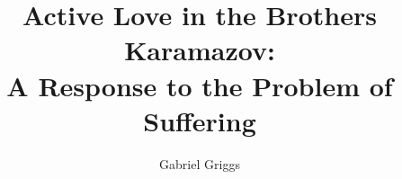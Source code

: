 \documentclass[12pt]{report}
\begin{document}
    
       \graduationmonth{}
       \graduationyear{}
       \author{Gabriel Griggs}
       \committee{}{}{}{}{}
       \title{Active Love in the Brothers Karamazov: \\ A Response to the Problem of Suffering}












%     

\end{document}
